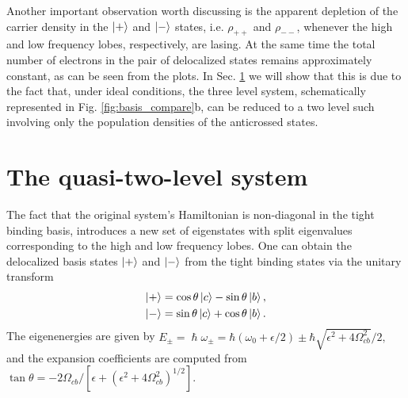 \documentclass[]{spie}  %
\begin{document}
Another important observation worth discussing is the apparent depletion of the carrier density in the $\ket{+}$ and $\ket{-}$ states, i.e. $\rho_{++}$ and $\rho_{--}$, whenever the high and low frequency lobes, respectively, are lasing. At the same time the total number of electrons in the pair of delocalized states remains approximately constant, as can be seen from the plots. In Sec. \ref{sec:theoretical-explaination-pulse-switching} we will show that this is due to the fact that, under ideal conditions, the three level system, schematically represented in Fig. \ref{fig:basis_compare}b, can be reduced to a two level such involving only the population densities of the anticrossed states. 

\section{The quasi-two-level system}
\label{sec:theoretical-explaination-pulse-switching}
The fact that the original system's Hamiltonian is non-diagonal in the tight binding basis, introduces a new set of eigenstates with split eigenvalues corresponding to the high and low frequency lobes. One can obtain the delocalized basis states $\ket{+}$ and $\ket{-}$ from the tight binding states via the unitary transform
\begin{align}
\label{eq:dressedstates}
\Ket{+} &= \cos\theta \Ket{c} - \sin\theta \Ket{b}, \nonumber \\
\Ket{-} &= \sin\theta \Ket{c} + \cos\theta \Ket{b}.
\end{align}
The eigenenergies are given by
$
E_\pm =\hslash \omega_{\pm} =\hbar(\omega_0 +\epsilon/2) \pm \hbar \sqrt{\epsilon^2+4\Omega_{cb}^2 }/2,
$
and the expansion coefficients are computed from  
$
\tan \theta = -2\Omega_{cb}/[\epsilon+(\epsilon^2+4\Omega_{cb}^2)^{1/2}].
$
\end{document}
